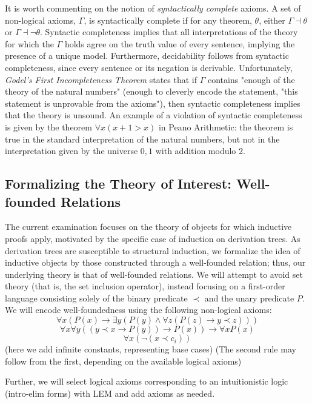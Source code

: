 \documentclass{article}
\begin{document}
It is worth commenting on the notion of \textit{syntactically complete} axioms. A set of non-logical axioms, $\Gamma$, is syntactically complete if for any theorem, $\theta$, either $\Gamma \dashv \theta $ or $\Gamma \dashv \lnot \theta $. Syntactic completeness implies that all interpretations of the theory for which the $\Gamma$ holds agree on the truth value of every sentence, implying the presence of a unique model. Furthermore, decidability follows from syntactic completeness, since every sentence or its negation is derivable. Unfortunately, \textit{Godel's First Incompleteness Theorem} states that if $\Gamma$ contains "enough of the theory of the natural numbers" (enough to cleverly encode the statement, "this statement is unprovable from the axioms"), then syntactic completeness implies that the theory is unsound. An example of a violation of syntactic completeness is given by the theorem $\forall x (x + 1 > x)$ in Peano Arithmetic: the theorem is true in the standard interpretation of the natural numbers, but not in the interpretation given by the universe ${0,1}$ with addition modulo 2.

\subsection{Formalizing the Theory of Interest: Well-founded Relations}
The current examination focuses on the theory of objects for which inductive proofs apply, motivated by the specific case of induction on derivation trees. As derivation trees are susceptible to structural induction, we formalize the idea of inductive objects by those constructed through a well-founded relation; thus, our underlying theory is that of well-founded relations. 
We will attempt to avoid set theory (that is, the set inclusion operator), instead focusing on a first-order language consisting solely of the binary predicate $\prec$ and the unary predicate $P$. We will encode well-foundedness using the following non-logical axioms:
$$\forall x (P(x) \to \exists y (P(y) \wedge \forall z (P(z) \to y \prec z))) $$
$$\forall x \forall y ((y \prec x \to P(y)) \to P(x)) \to \forall x P(x)$$
$$\forall x (\lnot (x \prec c_i))$$ (here we add infinite constants, representing base cases)
(The second rule may follow from the first, depending on the available logical axioms)

Further, we will select logical axioms corresponding to an intuitionistic logic (intro-elim forms) with LEM and add axioms as needed.
\end{document}
